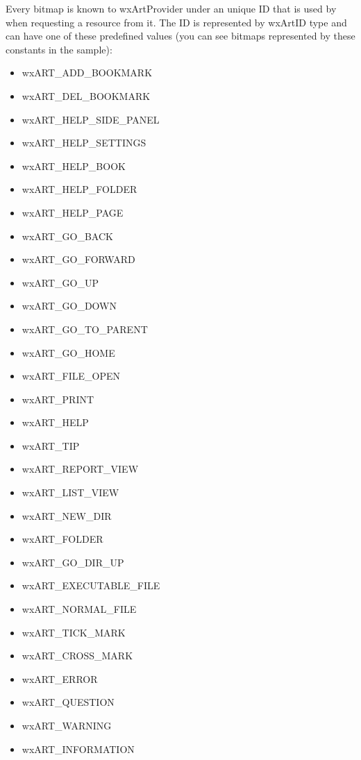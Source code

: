 Every bitmap is known to wxArtProvider under an unique ID that is used by when
requesting a resource from it. The ID is represented by wxArtID type and can
have one of these predefined values (you can see bitmaps represented by these
constants in the  sample):
\begin{itemize}\itemsep=0pt
\item wxART\_ADD\_BOOKMARK     
\item wxART\_DEL\_BOOKMARK     
\item wxART\_HELP\_SIDE\_PANEL  
\item wxART\_HELP\_SETTINGS    
\item wxART\_HELP\_BOOK        
\item wxART\_HELP\_FOLDER      
\item wxART\_HELP\_PAGE        
\item wxART\_GO\_BACK          
\item wxART\_GO\_FORWARD       
\item wxART\_GO\_UP            
\item wxART\_GO\_DOWN          
\item wxART\_GO\_TO\_PARENT     
\item wxART\_GO\_HOME          
\item wxART\_FILE\_OPEN        
\item wxART\_PRINT            
\item wxART\_HELP             
\item wxART\_TIP              
\item wxART\_REPORT\_VIEW      
\item wxART\_LIST\_VIEW        
\item wxART\_NEW\_DIR          
\item wxART\_FOLDER           
\item wxART\_GO\_DIR\_UP        
\item wxART\_EXECUTABLE\_FILE  
\item wxART\_NORMAL\_FILE      
\item wxART\_TICK\_MARK        
\item wxART\_CROSS\_MARK       
\item wxART\_ERROR            
\item wxART\_QUESTION         
\item wxART\_WARNING          
\item wxART\_INFORMATION      
\end{itemize}

